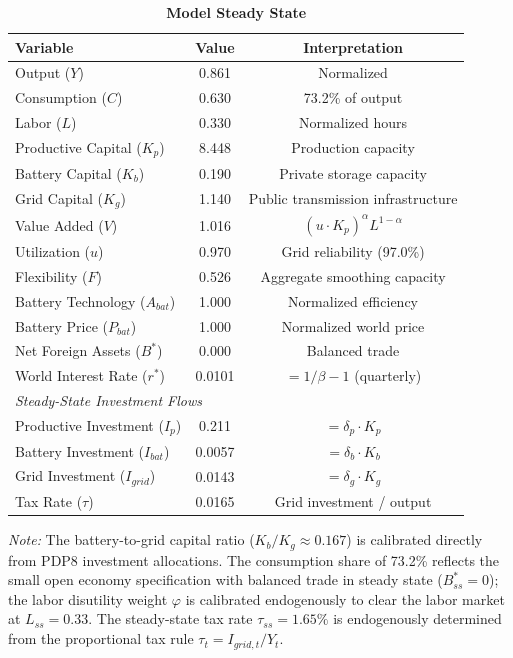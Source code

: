 \documentclass[12pt, a4paper]{article}
\begin{document}
\begin{table}[H]
    \centering
    \caption{\textbf{Model Steady State}}
    \label{tab:steady_state}
    \renewcommand{\arraystretch}{1.3}
    \begin{tabular}{lcc}
        \toprule
        \textbf{Variable} & \textbf{Value} & \textbf{Interpretation} \\
        \midrule
        Output ($Y$) & 0.861 & Normalized \\
        Consumption ($C$) & 0.630 & 73.2\% of output \\
        Labor ($L$) & 0.330 & Normalized hours \\
        Productive Capital ($K_p$) & 8.448 & Production capacity \\
        Battery Capital ($K_b$) & 0.190 & Private storage capacity \\
        Grid Capital ($K_g$) & 1.140 & Public transmission infrastructure \\
        Value Added ($V$) & 1.016 & $(u \cdot K_p)^\alpha L^{1-\alpha}$ \\
        Utilization ($u$) & 0.970 & Grid reliability (97.0\%) \\
        Flexibility ($F$) & 0.526 & Aggregate smoothing capacity \\
        Battery Technology ($A_{bat}$) & 1.000 & Normalized efficiency \\
        Battery Price ($P_{bat}$) & 1.000 & Normalized world price \\
        Net Foreign Assets ($B^*$) & 0.000 & Balanced trade \\
        World Interest Rate ($r^*$) & 0.0101 & $= 1/\beta - 1$ (quarterly) \\
        \midrule
        \multicolumn{3}{l}{\textit{Steady-State Investment Flows}} \\
        Productive Investment ($I_p$) & 0.211 & $= \delta_p \cdot K_p$ \\
        Battery Investment ($I_{bat}$) & 0.0057 & $= \delta_b \cdot K_b$ \\
        Grid Investment ($I_{grid}$) & 0.0143 & $= \delta_g \cdot K_g$ \\
        Tax Rate ($\tau$) & 0.0165 & Grid investment / output \\
        \bottomrule
    \end{tabular}
    \vspace{0.2cm}
    \parbox{\textwidth}{\footnotesize \textit{Note:} The battery-to-grid capital ratio ($K_b / K_g \approx 0.167$) is calibrated directly from PDP8 investment allocations. The consumption share of 73.2\% reflects the small open economy specification with balanced trade in steady state ($B^*_{ss} = 0$); the labor disutility weight $\varphi$ is calibrated endogenously to clear the labor market at $L_{ss} = 0.33$. The steady-state tax rate $\tau_{ss} = 1.65\%$ is endogenously determined from the proportional tax rule $\tau_t = I_{grid,t}/Y_t$.}
\end{table}
\end{document}
